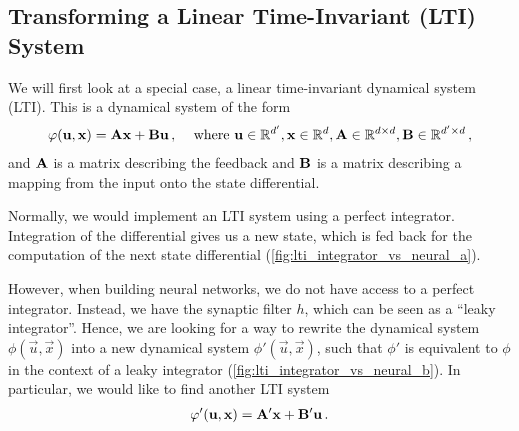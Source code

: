 \documentclass[10pt,letterpaper,oneside]{article}
\begin{document}
\subsection{Transforming a Linear Time-Invariant (LTI) System}
We will first look at a special case, a linear time-invariant dynamical system (LTI). This is a dynamical system of the form
\begin{align*}
	\varphi({\mathbf{u}}, {\mathbf{x}}) = {\mathbf{A}} {\mathbf{x}} + {\mathbf{B}} {\mathbf{u}} \,, && \text{ where } {\mathbf{u}} \in \mathbb{R}^{d'}, {\mathbf{x}} \in \mathbb{R}^{d}, {\mathbf{A}} \in \mathbb{R}^{d \times d}, {\mathbf{B}} \in \mathbb{R}^{d' \times d} \,,
\end{align*}
and ${\mathbf{A}}$ is a matrix describing the feedback and ${\mathbf{B}}$ is a matrix describing a mapping from the input onto the state differential.

Normally, we would implement an LTI system using a perfect integrator. Integration of the differential gives us a new state, which is fed back for the computation of the next state differential (\cref{fig:lti_integrator_vs_neural_a}).

However, when building neural networks, we do not have access to a perfect integrator. Instead, we have the synaptic filter $h$, which can be seen as a \enquote{leaky integrator}. Hence, we are looking for a way to rewrite the dynamical system $\phi(\vec u, \vec x)$ into a new dynamical system $\phi'(\vec u, \vec x)$, such that $\phi'$ is equivalent to $\phi$ in the context of a leaky integrator (\cref{fig:lti_integrator_vs_neural_b}). In particular, we would like to find another LTI system
\begin{align*}
	\varphi'({\mathbf{u}}, {\mathbf{x}}) = {\mathbf{A}}' {\mathbf{x}} + {\mathbf{B}}' {\mathbf{u}} \,.
\end{align*}
\end{document}
